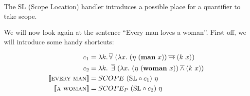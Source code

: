 The $\mathrm{SL}$ (Scope Location) handler introduces a possible place for
a quantifier to take scope.

We will now look again at the sentence ``Every man loves a woman''. First
off, we will introduce some handy shortcuts:

\begin{align*}
c_1 &= \lambda k. \mathop{\overline{\forall}}\ (\lambda x.\ (\eta\ (\textbf{man}\ x)) \mathbin{\overline{\to}} (k\ x)) \\
c_2 &= \lambda k.\ \mathop{\overline{\exists}}\ (\lambda x.\ (\eta\ (\textbf{woman}\ x)) \mathbin{\overline{\land}}
(k\ x)) \\
\llbracket \textsc{every}\ \textsc{man} \rrbracket &= SCOPE\ (\mathrm{SL} \circ c_1)\ \eta \\
\llbracket \textsc{a}\ \textsc{woman} \rrbracket &= SCOPE_P\ (\mathrm{SL} \circ c_2)\ \eta
\end{align*}


